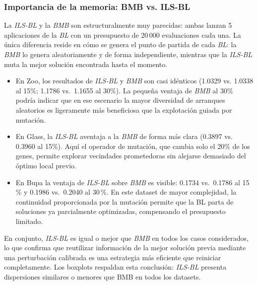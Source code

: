 \documentclass[12pt]{article}
\begin{document}
\subsubsection*{Importancia de la memoria: BMB vs. ILS-BL}
 
La \textit{ILS-BL} y la \textit{BMB} son estructuralmente muy parecidas: ambas lanzan 5 aplicaciones de
la \textit{BL} con un presupuesto de 20\,000 evaluaciones cada una. La única diferencia reside
en cómo se genera el punto de partida de cada \textit{BL}: la \textit{BMB} lo genera aleatoriamente
y de forma independiente, mientras que la \textit{ILS-BL} muta la mejor solución
encontrada hasta el momento.
 
\begin{itemize}
    \item En {Zoo}, los resultados de \textit{ILS-BL} y \textit{BMB} son casi idénticos (1.0329
    vs. 1.0338 al 15\%; 1.1786 vs.\ 1.1655 al 30\%).  La pequeña ventaja de \textit{BMB}
    al 30\% podría indicar que en ese escenario la mayor diversidad de arranques
    aleatorios es ligeramente más beneficiosa que la explotación guiada por mutación.
 
    \item En {Glass}, la \textit{ILS-BL} aventaja a la \textit{BMB} de forma más clara (0.3897
    vs. 0.3960 al 15\%).  Aquí el operador de mutación, que cambia solo el 20\%
    de los genes, permite explorar vecindades prometedoras sin alejarse demasiado del
    óptimo local previo.
 
    \item En {Bupa} la ventaja de \textit{ILS-BL} sobre \textit{BMB} es visible: 0.1734 vs.\
    0.1786 al 15\,\% y 0.1986 vs.\ 0.2040 al 30\,\%.  En este dataset de mayor
    complejidad, la continuidad proporcionada por la mutación permite que la BL parta de
    soluciones ya parcialmente optimizadas, compensando el presupuesto limitado.
\end{itemize}
 
\noindent En conjunto, \textit{ILS-BL} es igual o mejor que \textit{BMB} en todos los casos considerados,
lo que confirma que reutilizar información de la mejor solución previa mediante
una perturbación calibrada es una estrategia más eficiente que reiniciar completamente.
Los boxplots respaldan esta conclusión: \textit{ILS-BL} presenta dispersiones similares o menores
que BMB en todos los datasets.
 
\end{document}
